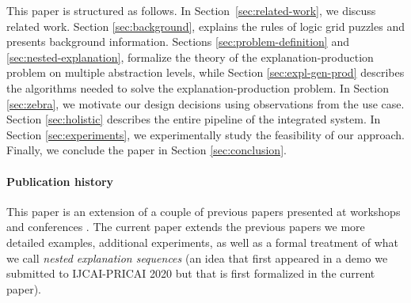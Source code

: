 This paper is structured as follows. In Section~\ref{sec:related-work}, we discuss related work. Section \ref{sec:background}, explains the rules of logic grid puzzles and presents background information. 
Sections \ref{sec:problem-definition} and \ref{sec:nested-explanation}, formalize the theory of the explanation-production problem on multiple abstraction levels, while Section \ref{sec:expl-gen-prod} describes the algorithms needed to solve the explanation-production problem. 
In Section \ref{sec:zebra}, we motivate our design decisions using observations from the use case. 
Section \ref{sec:holistic} describes the entire pipeline of the \ourtool integrated system. 
In Section \ref{sec:experiments}, we experimentally study the feasibility of our approach. 
Finally, we conclude the paper in Section \ref{sec:conclusion}.


\paragraph{Publication history} This paper is an extension of a couple of previous papers presented at workshops and conferences \cite{claesuser,DBLP:conf/bnaic/ClaesBCGG19,ecai/BogaertsGCG20}. The current paper extends the previous papers we more detailed examples, additional experiments, as well as a formal treatment of what we call \emph{nested explanation sequences} (an idea that first appeared in a demo we submitted to IJCAI-PRICAI 2020 but that is first formalized in the current paper).  

